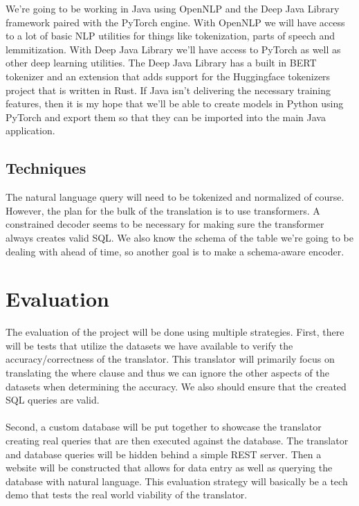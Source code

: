 \documentclass{article}
\begin{document}
We're going to be working in Java using OpenNLP and the Deep Java Library framework paired with the PyTorch engine.
With OpenNLP we will have access to a lot of basic NLP utilities for things like tokenization, parts of speech and lemmitization.
With Deep Java Library we'll have access to PyTorch as well as other deep learning utilities.
The Deep Java Library has a built in BERT tokenizer and an extension that adds support for the Huggingface tokenizers project that is written in Rust.
If Java isn't delivering the necessary training features, then it is my hope that we'll be able to
create models in Python using PyTorch and export them so that they can be imported into the main Java application.

\subsection*{Techniques}

The natural language query will need to be tokenized and normalized of course.
However, the plan for the bulk of the translation is to use transformers.
A constrained decoder seems to be necessary for making sure the transformer always
creates valid SQL. We also know the schema of the table we're going to be dealing with ahead of time, so another goal is to make a schema-aware encoder.

\section*{Evaluation}


The evaluation of the project will be done using multiple strategies. First, there will be tests
that utilize the datasets we have available to verify the accuracy/correctness of the translator. This translator
will primarily focus on translating the where clause and thus we can ignore the other aspects of the datasets when determining
the accuracy. We also should ensure that the created SQL queries are valid. \\ \\
Second, a custom database will be put together to showcase the translator creating real queries that are then
executed against the database. The translator and database queries will be hidden behind a simple REST server.
Then a website will be constructed that allows for data entry as well as querying the database with natural language.
This evaluation strategy will basically be a tech demo that tests the real world viability of the translator.
\end{document}
